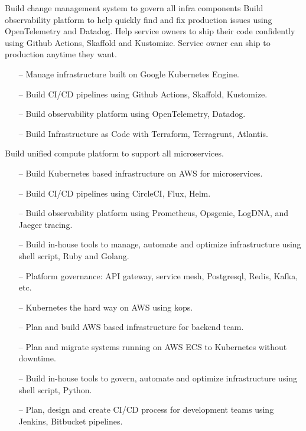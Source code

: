 \documentclass[8pt,a4paper, withhyper]{altacv}
\begin{document}
\begin{paracol}{2}

Build change management system to govern all infra components
Build observability platform to help quickly find and fix production issues using OpenTelemetry and Datadog.
Help service owners to ship their code confidently using Github Actions, Skaffold and Kustomize. Service owner can ship to production anytime they want.

\begin{itemize}
\item[--] Manage infrastructure built on Google Kubernetes Engine.
\item[--] Build CI/CD pipelines using Github Actions, Skaffold, Kustomize.
\item[--] Build observability platform using OpenTelemetry, Datadog.
\item[--] Build Infrastructure as Code with Terraform, Terragrunt, Atlantis.
\end{itemize}

\divider

Build unified compute platform to support all microservices.
\begin{itemize}
\item[--] Build Kubernetes based infrastructure on AWS for microservices.
\item[--] Build CI/CD pipelines using CircleCI, Flux, Helm.
\item[--] Build observability platform using Prometheus, Opsgenie, LogDNA, and Jaeger tracing.
\item[--] Build in-house tools to manage, automate and optimize infrastructure using shell script, Ruby and Golang.
\item[--] Platform governance: API gateway, service mesh, Postgresql, Redis, Kafka, etc.
\end{itemize}

\divider

\begin{itemize}
\item[--] Kubernetes the hard way on AWS using kops.
\item[--] Plan and build AWS based infrastructure for backend team.
\item[--] Plan and migrate systems running on AWS ECS to Kubernetes without downtime.
\item[--] Build in-house tools to govern, automate and optimize infrastructure using shell script, Python.
\item[--] Plan, design and create CI/CD process for development teams using Jenkins, Bitbucket pipelines.
\end{itemize}


\end{paracol}
\end{document}

